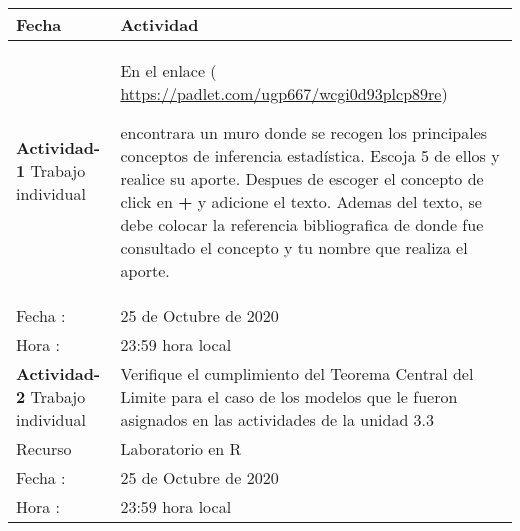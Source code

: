 \documentclass[base=hide,11pt]{elegantbook}
\begin{document}
\begin{tabular}{p{4cm}p{10cm}}
	\hline	
	Fecha                   & Actividad	\\
	\hline 	
	{\bf Actividad-1}  \hspace{4cm} Trabajo  individual      & 
	
	En el enlace 
	( 
	\href{https://padlet.com/ugp667/wcgi0d93plcp89re}{https://padlet.com/ugp667/wcgi0d93plcp89re})
	
	
	
	encontrara un muro donde se recogen los principales conceptos de inferencia estadística. Escoja 5 de ellos y realice su aporte. Despues de escoger el concepto de click en {\bf +} y adicione el texto. Ademas del texto, se debe colocar la referencia bibliografica de donde fue consultado el concepto y tu nombre que realiza el aporte.\\ 
	Fecha  : & 25 de Octubre de 2020\\
	Hora   : & 23:59 hora local \\
	\hline 

	{\bf Actividad-2}  \hspace{5cm} Trabajo individual& 
	Verifique el cumplimiento del Teorema Central del Limite para el caso de los modelos que le fueron asignados en las actividades de la unidad 3.3\\
	Recurso            & Laboratorio en R	\\
	Fecha  : & 25 de Octubre de 2020\\
	Hora   : & 23:59 hora local \\
	\hline 
	
	\hline 
\end{tabular}
\end{document}
